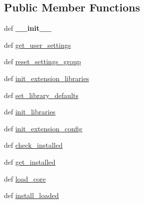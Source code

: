 \subsection*{Public Member Functions}
\begin{DoxyCompactItemize}
\item 
\hypertarget{classcommotion__client_1_1utils_1_1extension__manager_1_1ExtensionManager_a98ed5baeb8363089a665d7a4fbcc6198}{def {\bfseries \-\_\-\-\_\-init\-\_\-\-\_\-}}\label{classcommotion__client_1_1utils_1_1extension__manager_1_1ExtensionManager_a98ed5baeb8363089a665d7a4fbcc6198}

\item 
def \hyperlink{classcommotion__client_1_1utils_1_1extension__manager_1_1ExtensionManager_a25c38ac92dceebe57891ce0ed422505e}{get\-\_\-user\-\_\-settings}
\item 
def \hyperlink{classcommotion__client_1_1utils_1_1extension__manager_1_1ExtensionManager_ae90e7bfde555094ce23154a21baafd02}{reset\-\_\-settings\-\_\-group}
\item 
def \hyperlink{classcommotion__client_1_1utils_1_1extension__manager_1_1ExtensionManager_a5a94323a3528a6af3bf009eb302fa729}{init\-\_\-extension\-\_\-libraries}
\item 
def \hyperlink{classcommotion__client_1_1utils_1_1extension__manager_1_1ExtensionManager_ab2a55f25d0f1dbce2924c28513fac830}{set\-\_\-library\-\_\-defaults}
\item 
def \hyperlink{classcommotion__client_1_1utils_1_1extension__manager_1_1ExtensionManager_a2edb9c39e0b8e5143c245089170182a3}{init\-\_\-libraries}
\item 
def \hyperlink{classcommotion__client_1_1utils_1_1extension__manager_1_1ExtensionManager_ae751a1b407e33af012d41ec44f2ce717}{init\-\_\-extension\-\_\-config}
\item 
def \hyperlink{classcommotion__client_1_1utils_1_1extension__manager_1_1ExtensionManager_a549fdfd52d8e355e4bac34907ef74e2a}{check\-\_\-installed}
\item 
def \hyperlink{classcommotion__client_1_1utils_1_1extension__manager_1_1ExtensionManager_aa2b5054f6495fbc20e556f5713550d01}{get\-\_\-installed}
\item 
def \hyperlink{classcommotion__client_1_1utils_1_1extension__manager_1_1ExtensionManager_a98f5f3c261f083885a9b0528dcdafd34}{load\-\_\-core}
\item 
def \hyperlink{classcommotion__client_1_1utils_1_1extension__manager_1_1ExtensionManager_a58bcb83cefe458d4affcb185785694c6}{install\-\_\-loaded}

\end{DoxyCompactItemize}
